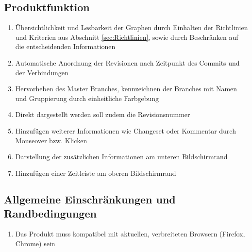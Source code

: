 \documentclass[nocolor]{tudbook}
\begin{document}
\subsection{Produktfunktion}
\begin{enumerate}[F1]
\item Übersichtlichkeit und Lesbarkeit der Graphen durch Einhalten der Richtlinien und Kriterien aus Abschnitt \ref{sec:Richtlinien}, sowie durch Beschränken auf die entscheidenden Informationen
	\item Automatische Anordnung der Revisionen nach Zeitpunkt des Commits und der Verbindungen
	\item Hervorheben des Master Branches, kennzeichnen der Branches mit Namen und Gruppierung durch einheitliche Farbgebung
	\item Direkt dargestellt werden soll zudem die Revisionsnummer
	\item Hinzufügen weiterer Informationen wie Changeset oder Kommentar durch Mouseover bzw. Klicken
	\item Darstellung der zusätzlichen Informationen am unteren Bildschirmrand
	\item Hinzufügen einer Zeitleiste am oberen Bildschirmrand
\end{enumerate}

\subsection{Allgemeine Einschränkungen und Randbedingungen}
\begin{enumerate}[R1]
	\item Das Produkt muss kompatibel mit aktuellen, verbreiteten Browsern (Firefox, Chrome) sein
\end{enumerate}
\end{document}
